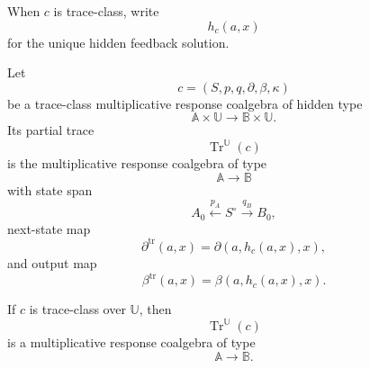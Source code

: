 When \(c\) is trace-class, write
\[
h_c(a,x)
\]
for the unique hidden feedback solution.

\begin{definition}
\label{def:partial-trace-response-coalgebras}
Let
\[
c=(S,p,q,\partial,\beta,\kappa)
\]
be a trace-class multiplicative response coalgebra of hidden type
\[
\mathbb A\times\mathbb U
\longrightarrow
\mathbb B\times\mathbb U.
\]
Its partial trace
\[
\operatorname{Tr}^{\mathbb U}(c)
\]
is the multiplicative response coalgebra of type
\[
\mathbb A\longrightarrow\mathbb B
\]
with state span
\[
A_0
\xleftarrow{p_A}
S^\circ
\xrightarrow{q_B}
B_0,
\]
next-state map
\[
\partial^{\operatorname{tr}}(a,x)
=
\partial(a,h_c(a,x),x),
\]
and output map
\[
\beta^{\operatorname{tr}}(a,x)
=
\beta(a,h_c(a,x),x).
\]
\end{definition}

\begin{proposition}
\label{prop:coalgebra-trace-well-defined}
If \(c\) is trace-class over \(\mathbb U\), then
\[
\operatorname{Tr}^{\mathbb U}(c)
\]
is a multiplicative response coalgebra of type
\[
\mathbb A\longrightarrow\mathbb B.
\]
\end{proposition}

